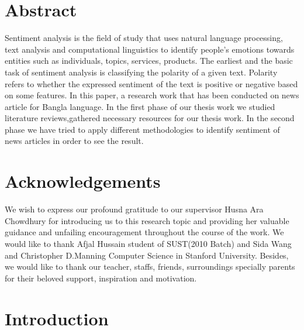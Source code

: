 \documentclass[a4paper,12pt]{report}
\begin{document}
\chapter*{Abstract}
    Sentiment analysis is the field of study that  uses  natural language processing, text analysis and computational linguistics to identify people’s emotions towards entities such as individuals, topics, services, products. The earliest and the basic task of sentiment analysis is classifying the polarity of a given text. Polarity refers to whether the expressed sentiment of the text is positive or negative based on some features. In this paper, a research work that has been conducted on news article for Bangla language. In the first phase of our thesis work we studied literature reviews,gathered necessary resources for our thesis work. In the second phase we have tried to apply different methodologies to identify sentiment of news articles in order to see the result.
    

\chapter*{Acknowledgements}
    We wish to express our profound gratitude to our supervisor Husna Ara Chowdhury for introducing us to this research topic and providing her valuable guidance and unfailing encouragement throughout the course of the work. We would like to thank Afjal Hussain student of SUST(2010 Batch) and Sida Wang and Christopher D.Manning Computer Science in Stanford University. Besides, we would like to thank our teacher, staffs, friends, surroundings specially parents for their beloved support, inspiration and motivation.
\clearpage
\tableofcontents
\listoftables
\listoffigures


\chapter{Introduction}
\end{document}
